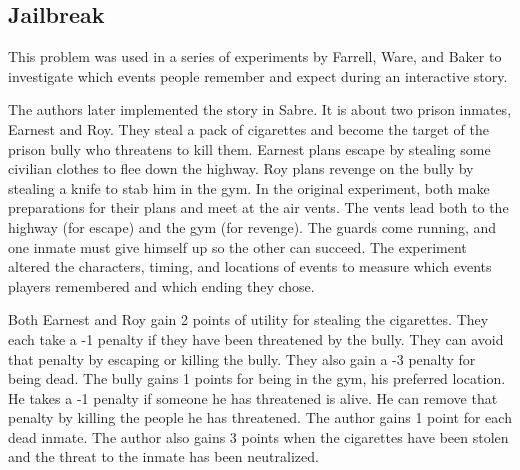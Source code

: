 \documentclass{nilreport}
\makeatletter
\renewcommand{\bibentry}[1]{\nocite{#1}{\frenchspacing\@nameuse{BR@r@#1\@extra@b@citeb}}}
\makeatother
\begin{document}
\subsection{Jailbreak}

This problem was used in a series of experiments by Farrell, Ware,
and Baker to investigate which events people remember and expect during
an interactive story.

\begin{quote}
	\bibentry{farrell2020manipulating}
\end{quote}

\noindent The authors later implemented the story in Sabre. It is
about two prison inmates, Earnest and Roy. They steal a pack of cigarettes
and become the target of the prison bully who threatens to kill them.
Earnest plans escape by stealing some civilian clothes to flee down
the highway. Roy plans revenge on the bully by stealing a knife to
stab him in the gym. In the original experiment, both make preparations
for their plans and meet at the air vents. The vents lead both to
the highway (for escape) and the gym (for revenge). The guards come
running, and one inmate must give himself up so the other can succeed.
The experiment altered the characters, timing, and locations of events
to measure which events players remembered and which ending they chose.

Both Earnest and Roy gain 2 points of utility for stealing the cigarettes.
They each take a -1 penalty if they have been threatened by the bully.
They can avoid that penalty by escaping or killing the bully. They
also gain a -3 penalty for being dead. The bully gains 1 points for
being in the gym, his preferred location. He takes a -1 penalty if
someone he has threatened is alive. He can remove that penalty by
killing the people he has threatened. The author gains 1 point for
each dead inmate. The author also gains 3 points when the cigarettes
have been stolen and the threat to the inmate has been neutralized.

\medskip{}
\noindent{}
\end{document}
